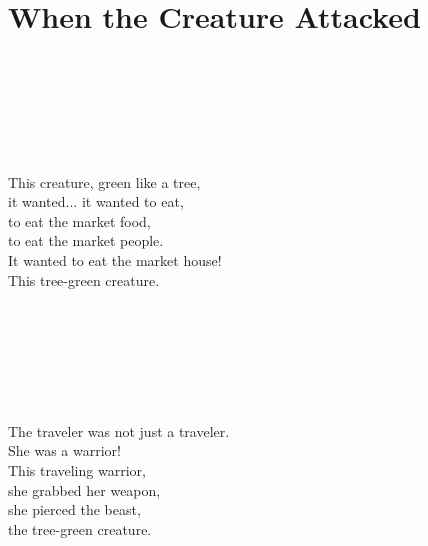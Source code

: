 \documentclass{ctexart}
\begin{document}
\section[獣ぴ鬥え人]{
  \Huge\englishundertokisin
    {}
    {\large\normalfont{}When the Creature Attacked}
}

\noindent
\begin{minipage}[t]{5.75cm}
{\textCJKserif{}\large
  \\
  \\
  \\
  \\
  \\
  \\
  \scriptsize
  This creature, green like a tree,\\
  it wanted... it wanted to eat,\\
  to eat the market food,\\
  to eat the market people.\\
  It wanted to eat the market house!\\
  This tree-green creature.\\
}
\end{minipage}
\begin{minipage}[t]{5.75cm}
{\textCJKserif{}\large
  \\
  \\
  \\
  \\
  \\
  \\
    \scriptsize
  The traveler was not just a traveler.\\
  She was a warrior!\\
  This traveling warrior,\\
  she grabbed her weapon,\\
  she pierced the beast,\\
  the tree-green creature.\\
}
\end{minipage}
\end{document}
